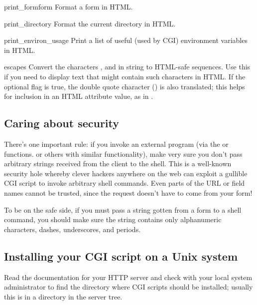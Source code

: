 \begin{funcdesc}{print_form}{form}
Format a form in HTML.
\end{funcdesc}

\begin{funcdesc}{print_directory}{}
Format the current directory in HTML.
\end{funcdesc}

\begin{funcdesc}{print_environ_usage}{}
Print a list of useful (used by CGI) environment variables in
HTML.
\end{funcdesc}

\begin{funcdesc}{escape}{s}
Convert the characters
\character{\&}, \character{<} and \character{>} in string  to
HTML-safe sequences.  Use this if you need to display text that might
contain such characters in HTML.  If the optional flag  is
true, the double quote character () is also translated;
this helps for inclusion in an HTML attribute value, as in .
\end{funcdesc}


\subsection{Caring about security}

There's one important rule: if you invoke an external program (via the
 or  functions. or others
with similar functionality), make very sure you don't pass arbitrary
strings received from the client to the shell.  This is a well-known
security hole whereby clever hackers anywhere on the web can exploit a
gullible CGI script to invoke arbitrary shell commands.  Even parts of
the URL or field names cannot be trusted, since the request doesn't
have to come from your form!

To be on the safe side, if you must pass a string gotten from a form
to a shell command, you should make sure the string contains only
alphanumeric characters, dashes, underscores, and periods.


\subsection{Installing your CGI script on a Unix system}

Read the documentation for your HTTP server and check with your local
system administrator to find the directory where CGI scripts should be
installed; usually this is in a directory  in the server tree.

